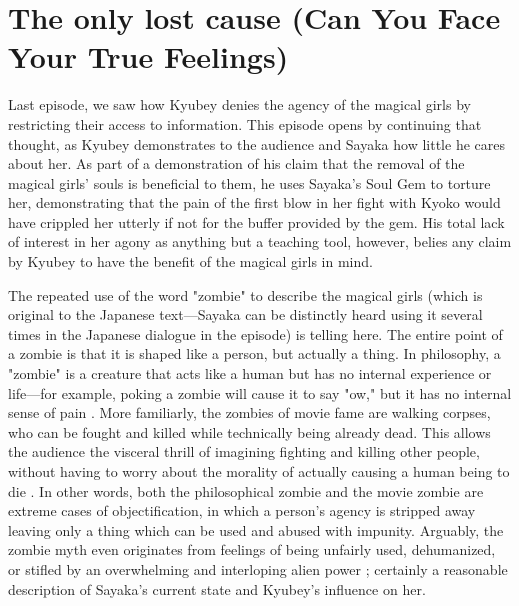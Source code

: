 \chapter{The only lost cause (Can You Face Your True Feelings)}
Last episode, we saw how Kyubey denies the agency of the magical girls by restricting their access to information. This episode opens by continuing that thought, as Kyubey demonstrates to the audience and Sayaka how little he cares about her. As part of a demonstration of his claim that the removal of the magical girls' souls is beneficial to them, he uses Sayaka's Soul Gem to torture her, demonstrating that the pain of the first blow in her fight with Kyoko would have crippled her utterly if not for the buffer provided by the gem. His total lack of interest in her agony as anything but a teaching tool, however, belies any claim by Kyubey to have the benefit of the magical girls in mind.

The repeated use of the word "zombie" to describe the magical girls (which is original to the Japanese text—Sayaka can be distinctly heard using it several times in the Japanese dialogue in the episode) is telling here. The entire point of a zombie is that it is shaped like a person, but actually a thing. In philosophy, a "zombie" is a creature that acts like a human but has no internal experience or life—for example, poking a zombie will cause it to say "ow," but it has no internal sense of pain \cite{ref50}. More familiarly, the zombies of movie fame are walking corpses, who can be fought and killed while technically being already dead. This allows the audience the visceral thrill of imagining fighting and killing other people, without having to worry about the morality of actually causing a human being to die \cite{ref51}. In other words, both the philosophical zombie and the movie zombie are extreme cases of objectification, in which a person's agency is stripped away leaving only a thing which can be used and abused with impunity. Arguably, the zombie myth even originates from feelings of being unfairly used, dehumanized, or stifled by an overwhelming and interloping alien power \cite{ref52}; certainly a reasonable description of Sayaka's current state and Kyubey's influence on her.

